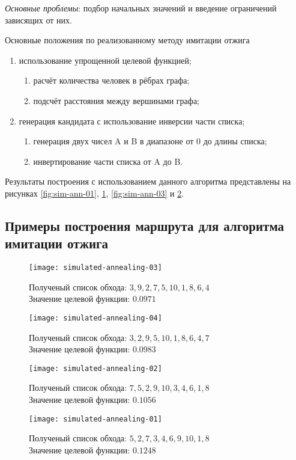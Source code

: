 \emph{Основные проблемы}: подбор начальных значений и введение ограничений зависящих от них.

Основные положения по реализованному методу имитации отжига
\begin{enumerate}
    \item использование упрощенной целевой функцией;
    \begin{enumerate}
        \item расчёт количества человек в рёбрах графа;
        \item подсчёт расстояния между вершинами графа;
    \end{enumerate}
    \item генерация кандидата с использование инверсии части списка;
    \begin{enumerate}
        \item генерация двух чисел A и B в диапазоне от 0 до длины списка;
        \item инвертирование части списка от A до B.
    \end{enumerate}
\end{enumerate}

Результаты построения с использованием данного алгоритма представлены на рисунках 
\ref{fig:sim-ann-01}, \ref{fig:sim-ann-02}, \ref{fig:sim-ann-03} и \ref{fig:sim-ann-04}.

\newpage
\subsection{Примеры построения маршрута для алгоритма имитации отжига}
\begin{figure}[ht!]
    \centering
    \texttt{[image: simulated-annealing-03]}
    \caption{Полученый список обхода: \( 3, 9, 2, 7, 5, 10, 1, 8, 6, 4 \)\\
        Значение целевой функции: \( 0.0971 \)}
    \label{fig:sim-ann-01}
    \texttt{[image: simulated-annealing-04]}
    \caption{Полученый список обхода: \( 3, 2, 9, 5, 10, 1, 8, 6, 4, 7 \)\\
        Значение целевой функции: \( 0.0983 \)}
    \label{fig:sim-ann-02}
\end{figure}
\begin{figure}[ht!]
    \centering
    \texttt{[image: simulated-annealing-02]}
    \caption{Полученый список обхода: \( 7, 5, 2, 9, 10, 3, 4, 6, 1, 8 \)\\
        Значение целевой функции: \( 0.1056 \)}
    \label{fig:sim-ann-03}
    \texttt{[image: simulated-annealing-01]}
    \caption{Полученый список обхода: \( 5, 2, 7, 3, 4, 6, 9, 10, 1, 8 \)\\
        Значение целевой функции: \( 0.1248 \)}
    \label{fig:sim-ann-04}
\end{figure}
\newpage

